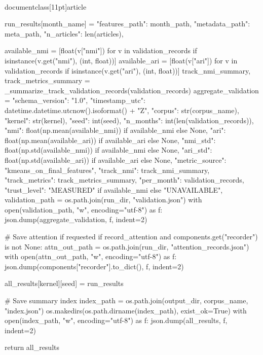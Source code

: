 \\documentclass[11pt]{article}
\begin{document}
\begin{CodeBlock}
                run_results[month_name] = {
                    "features_path": month_path,
                    "metadata_path": meta_path,
                    "n_articles": len(articles),
                }

            available_nmi = [float(v["nmi"]) for v in validation_records if isinstance(v.get("nmi"), (int, float))]
            available_ari = [float(v["ari"]) for v in validation_records if isinstance(v.get("ari"), (int, float))]
            track_nmi_summary, track_metrics_summary = _summarize_track_validation_records(validation_records)
            aggregate_validation = {
                "schema_version": "1.0",
                "timestamp_utc": datetime.datetime.utcnow().isoformat() + "Z",
                "corpus": str(corpus_name),
                "kernel": str(kernel),
                "seed": int(seed),
                "n_months": int(len(validation_records)),
                "nmi": float(np.mean(available_nmi)) if available_nmi else None,
                "ari": float(np.mean(available_ari)) if available_ari else None,
                "nmi_std": float(np.std(available_nmi)) if available_nmi else None,
                "ari_std": float(np.std(available_ari)) if available_ari else None,
                "metric_source": "kmeans_on_final_features",
                "track_nmi": track_nmi_summary,
                "track_metrics": track_metrics_summary,
                "per_month": validation_records,
                "trust_level": "MEASURED" if available_nmi else "UNAVAILABLE",
            }
            validation_path = os.path.join(run_dir, "validation.json")
            with open(validation_path, "w", encoding="utf-8") as f:
                json.dump(aggregate_validation, f, indent=2)

            # Save attention if requested
            if record_attention and components.get("recorder") is not None:
                attn_out_path = os.path.join(run_dir, "attention_records.json")
                with open(attn_out_path, "w", encoding="utf-8") as f:
                    json.dump(components["recorder"].to_dict(), f, indent=2)

            all_results[kernel][seed] = run_results

    # Save summary index
    index_path = os.path.join(output_dir, corpus_name, "index.json")
    os.makedirs(os.path.dirname(index_path), exist_ok=True)
    with open(index_path, "w", encoding="utf-8") as f:
        json.dump(all_results, f, indent=2)

    return all_results



\end{CodeBlock}
\end{document}
